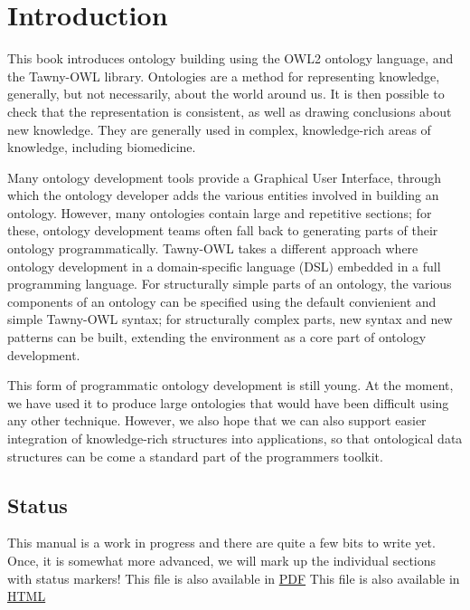 \chapter{Introduction}

This book introduces ontology building using the OWL2 ontology language, and
the Tawny-OWL library. Ontologies are a method for representing knowledge,
generally, but not necessarily, about the world around us. It is then possible
to check that the representation is consistent, as well as drawing conclusions
about new knowledge. They are generally used in complex, knowledge-rich areas
of knowledge, including biomedicine.

Many ontology development tools provide a Graphical User Interface, through
which the ontology developer adds the various entities involved in building an
ontology. However, many ontologies contain large and repetitive sections; for
these, ontology development teams often fall back to generating parts of their
ontology programmatically. Tawny-OWL takes a different approach where ontology
development in a domain-specific language (DSL) embedded in a full programming
language. For structurally simple parts of an ontology, the various components
of an ontology can be specified using the default convienient and simple
Tawny-OWL syntax; for structurally complex parts, new syntax and new patterns
can be built, extending the environment as a core part of ontology
development.

This form of programmatic ontology development is still young. At the moment,
we have used it to produce large ontologies that would have been difficult
using any other technique. However, we also hope that we can also support
easier integration of knowledge-rich structures into applications, so that
ontological data structures can be come a standard part of the programmers
toolkit.


\section{Status}
\label{sec-1-1}

This manual is a work in progress and there are quite a few bits to write yet.
Once, it is somewhat more advanced, we will mark up the individual sections
with status markers!
\ifdefined\HCode
This file is also available in \href{http://homepages.cs.ncl.ac.uk/phillip.lord/take-wing/take_wing.pdf}{PDF}
\else
This file is also available in \href{http://homepages.cs.ncl.ac.uk/phillip.lord/take-wing/take_wing.html}{HTML}
\fi

